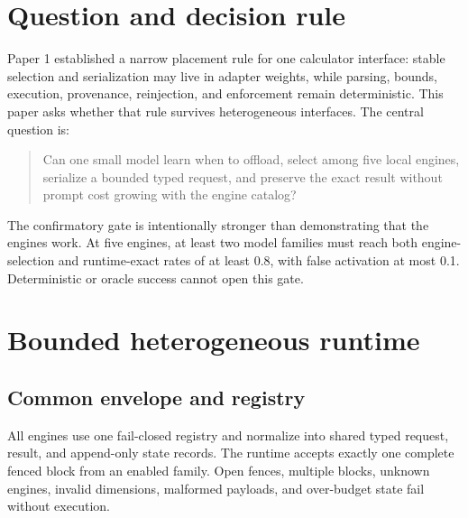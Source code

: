 \documentclass[10pt]{article}
\begin{document}
\begin{abstract}
but a 24-row authority subset finds only 0.042 effects from masking the result or
removing the distractor and no question/result-competition support.  Provenance
bias remains unlicensed.  A registered 2,253-row public suite first exposes a
formalization/backend gap.  We then freeze an executable 60-row slice spanning
GSM8K, units, dates, ProofWriter, and CLUTRR.  Qwen makes no valid voluntary
four-tool calls; a disjoint shared-token BM25 router selects all 60 engines, but
neural result integration preserves only 41 exact results.  Direct runtime-copy
is 60/60 with zero model calls.  Thus public transfer identifies both routing
and result-use failures; the Paper 3 gate remains \texttt{no\_go}.
\end{abstract}

\section{Question and decision rule}

Paper 1 established a narrow placement rule for one calculator interface:
stable selection and serialization may live in adapter weights, while parsing,
bounds, execution, provenance, reinjection, and enforcement remain deterministic.
This paper asks whether that rule survives heterogeneous interfaces.  The central
question is:

\begin{quote}
Can one small model learn when to offload, select among five local engines,
serialize a bounded typed request, and preserve the exact result without prompt
cost growing with the engine catalog?
\end{quote}

The confirmatory gate is intentionally stronger than demonstrating that the
engines work.  At five engines, at least two model families must reach both
engine-selection and runtime-exact rates of at least 0.8, with false activation
at most 0.1.  Deterministic or oracle success cannot open this gate.

\section{Bounded heterogeneous runtime}

\subsection{Common envelope and registry}

All engines use one fail-closed registry and normalize into shared typed request,
result, and append-only state records.  The runtime
accepts exactly one complete fenced block from an enabled family.  Open fences,
multiple blocks, unknown engines, invalid dimensions, malformed payloads, and
over-budget state fail without execution.
\end{document}
